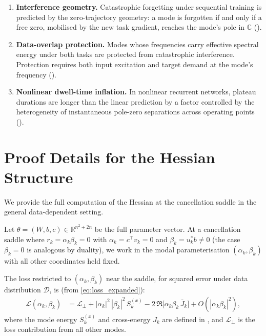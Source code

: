 \documentclass[11pt,a4paper]{article}
\theoremstyle{definition}
\newcommand{\C}{\mathbb{C}}
\newcommand{\R}{\mathbb{R}}
\newcommand{\cL}{\mathcal{L}}
\newcommand{\cD}{\mathcal{D}}
\begin{document}
\begin{enumerate}[label=\textbf{P\arabic*.}]
  \item \textbf{Interference geometry.} Catastrophic forgetting
    under sequential training is predicted by the zero-trajectory
    geometry: a mode is forgotten if and only if a free zero,
    mobilised by the new task gradient, reaches the mode's pole
    in $\C$ ().

  \item \textbf{Data-overlap protection.} Modes whose frequencies
    carry effective spectral energy under both tasks are protected
    from catastrophic interference. Protection requires both
    input excitation and target demand at the mode's frequency
    ().

  \item \textbf{Nonlinear dwell-time inflation.} In nonlinear
    recurrent networks, plateau durations are longer than the
    linear prediction by a factor controlled by the heterogeneity
    of instantaneous pole-zero separations across operating points
    ().
\end{enumerate}

\appendix
\section{Proof Details for the Hessian Structure}\label{app:hessian}

We provide the full computation of the Hessian at the cancellation
saddle in the general data-dependent setting.

Let $\theta = (W, b, c) \in \R^{n^2 + 2n}$ be the full parameter
vector. At a cancellation saddle where $r_k = \alpha_k\beta_k = 0$
with $\alpha_k = c^{\top}v_k = 0$ and $\beta_k = u_k^*b \neq 0$
(the case $\beta_k = 0$ is analogous by duality), we work in the
modal parameterisation $(\alpha_k, \beta_k)$ with all other
coordinates held fixed.

The loss restricted to $(\alpha_k, \beta_k)$ near the saddle,
for squared error under data distribution $\cD$, is
(from \eqref{eq:loss_expanded}):
\begin{align}
  \cL(\alpha_k, \beta_k)
  &= \cL_{\perp}
  + |\alpha_k|^2\,|\beta_k|^2\, S_k^{(x)}
  - 2\,\Re\!\bigl[\alpha_k\beta_k\, \bar{J}_k\bigr]
  + O(|\alpha_k\beta_k|^2),
\end{align}
where the mode energy $S_k^{(x)}$ and cross-energy $J_k$ are
defined in , and
$\cL_{\perp}$ is the loss contribution from all other modes.
\end{document}
